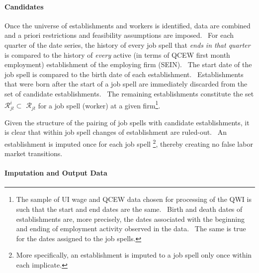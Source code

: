 \paragraph{Candidates}

Once the universe of establishments and workers is identified, data are
combined and a priori restrictions and feasibility assumptions are imposed.
\ For each quarter of the date series, the history of every job spell that 
\textit{ends in that quarter} is compared to the history of \textit{every}
active (in terms of QCEW first month employment) establishment of the
employing firm (SEIN). \ The start date of the job spell is compared to the
birth date of each establishment. \ Establishments that were born after the
start of a job spell are immediately discarded from the set of candidate
establishments. \ The remaining establishments constitute the set $\mathcal{R%
}_{jt}^{i}\subset $ $\mathcal{R}_{jt}$ for a job spell (worker) at a given
firm\footnote{%
The sample of UI wage and QCEW data chosen for processing of the QWI is such
that the start and end dates are the same. \ Birth and death dates of
establishments are, more precisely, the dates associated with the beginning
and ending of employment activity observed in the data. \ The same is true
for the dates assigned to the job spells.}. \ \ 

Given the structure of the pairing of job spells with candidate
establishments, it is clear that within job spell changes of establishment
are ruled-out. \ An establishment is imputed once for each job spell%
\footnote{%
More specifically, an establishment is imputed to a job spell only once
within each implicate.}, thereby creating no false labor market transitions.

\paragraph{Imputation and Output Data}

